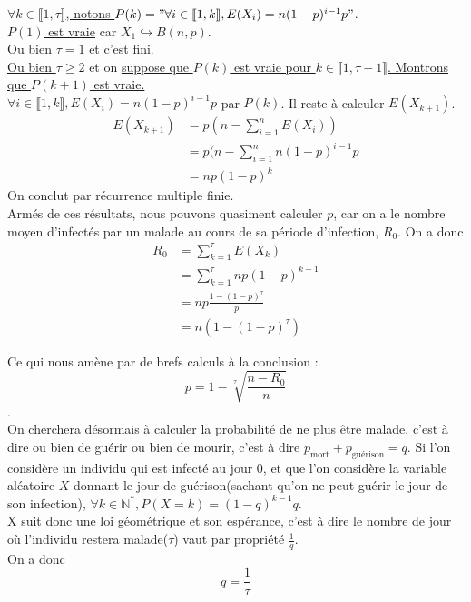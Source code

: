 \documentclass{article}
\begin{document}
	\underline{$\forall k \in \llbracket 1, \tau \rrbracket$, notons $P(k) = "\forall i \in \llbracket 1, k \rrbracket, E(X_i) = n(1-p)^{i-1}p"$}.\\[0.2cm]
	\underline{$P(1)$ est vraie} car $X_1 \hookrightarrow B(n, p)$.\\[0.2cm]
	\underline{Ou bien $\tau = 1$} et c'est fini.\\[0.2cm]
	\underline{Ou bien $\tau \ge 2$} et on \underline{suppose que $P(k)$ est vraie pour $k \in \llbracket 1, \tau - 1 \rrbracket$. Montrons que $P(k+1)$ est vraie.}\\[0.2cm]
	$\forall i \in \llbracket 1, k \rrbracket, E(X_i) = n(1-p)^{i-1}p$ par $P(k)$. Il reste à calculer $E(X_{k+1})$.\\
	\begin{align*}
		E(X_{k+1}) &= p(n - \sum_{i = 1}^n E(X_i)) \\
		           &= p(n - \sum_{i = 1}^n n(1-p)^{i - 1}p \\
		           &= np(1-p)^k
	\end{align*}
	On conclut par récurrence multiple finie.\\
	Armés de ces résultats, nous pouvons quasiment calculer $p$, car on a le nombre moyen d'infectés par un malade au cours de sa période d'infection, $R_0$. On a donc 
	\begin{align*}
		R_0 &= \sum_{k=1}^\tau E(X_k) \\
		    &= \sum_{k=1}^\tau np(1-p)^{k-1}\\
		    &= np\frac{1 - (1-p)^\tau}{p}\\
		    &= n(1 - (1-p)^\tau)
	\end{align*}
	
	Ce qui nous amène par de brefs calculs à la conclusion : \\
	$$p = 1 - \sqrt[\tau]{\frac{n - R_0}{n}}$$.\\
	
	On cherchera désormais à calculer la probabilité de ne plus être malade, c'est à dire ou bien de guérir ou bien de mourir, c'est à dire $p_{\text{mort}} + p_{\text{guérison}} = q$. Si l'on considère un individu qui est infecté au jour $0$, et que l'on considère la variable aléatoire $X$ donnant le jour de guérison(sachant qu'on ne peut guérir le jour de son infection), $\forall k \in \mathbb{N}^*, P(X=k) = (1-q)^{k-1}q$.\\
	X suit donc une loi géométrique et son espérance, c'est à dire le nombre de jour où l'individu restera malade($\tau$) vaut par propriété $\frac{1}{q}$.\\
	On a donc $$ q = \frac{1}{\tau}$$\\
	
\end{document}
